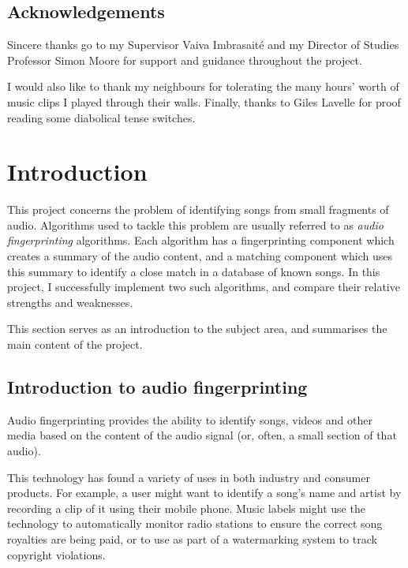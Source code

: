 \documentclass[12pt,a4paper,twoside,openright]{report}
\begin{document}

\newpage
\section*{Acknowledgements}

Sincere thanks go to my Supervisor Vaiva Imbrasait\'{e} and my Director of Studies Professor Simon Moore for support and guidance throughout the project.

I would also like to thank my neighbours for tolerating the many hours' worth of music clips I played through their walls. Finally, thanks to Giles Lavelle for proof reading some diabolical tense switches.


\tableofcontents



\cleardoublepage
\pagestyle{headings}


\chapter{Introduction}
\label{introduction}

This project concerns the problem of identifying songs from small fragments of audio. Algorithms used to tackle this problem are usually referred to as \emph{audio fingerprinting} algorithms. Each algorithm has a fingerprinting component which creates a summary of the audio content, and a matching component which uses this summary to identify a close match in a database of known songs. In this project, I successfully implement two such algorithms, and compare their relative strengths and weaknesses.

This section serves as an introduction to the subject area, and summarises the main content of the project.

\section{Introduction to audio fingerprinting}

Audio fingerprinting provides the ability to identify songs, videos and other media based on the content of the audio signal (or, often, a small section of that audio).

This technology has found a variety of uses in both industry and consumer products. For example, a user might want to identify a song's name and artist by recording a clip of it using their mobile phone. Music labels might use the technology to automatically monitor radio stations to ensure the correct song royalties are being paid, or to use as part of a watermarking system to track copyright violations.
\end{document}
